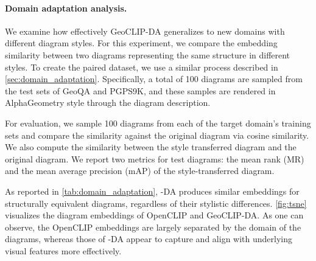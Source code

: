 


\paragraph{Domain adaptation analysis.}
We examine how effectively GeoCLIP-DA generalizes to new domains with different diagram styles. For this experiment, we compare the embedding similarity between two diagrams representing the same structure in different styles. To create the paired dataset, we use a similar process described in \cref{sec:domain_adaptation}. Specifically, a total of 100 diagrams are sampled from the test sets of GeoQA and PGPS9K, and these samples are rendered in AlphaGeometry style through the diagram description.

For evaluation, we sample 100 diagrams from each of the target domain's training sets and compare the similarity against the original diagram via cosine similarity. We also compute the similarity between the style transferred diagram and the original diagram. 
We report two metrics for test diagrams: the mean rank (MR) and the mean average precision (mAP) of the style-transferred diagram.

As reported in \cref{tab:domain_adaptation}, \geoclip{}-DA produces similar embeddings for structurally equivalent diagrams, regardless of their stylistic differences. \cref{fig:tsne} visualizes the diagram embeddings of OpenCLIP and GeoCLIP-DA. As one can observe, the OpenCLIP embeddings are largely separated by the domain of the diagrams, whereas those of \geoclip{}-DA appear to capture and align with underlying visual features more effectively.

% 
